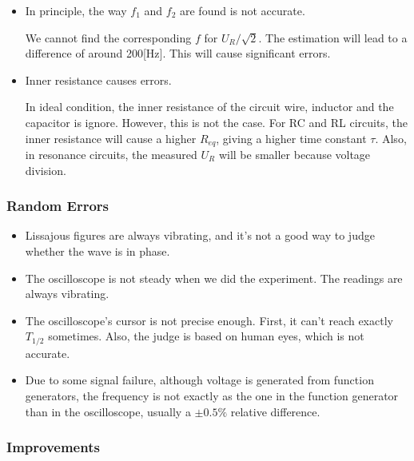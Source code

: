 \documentclass[a4paper]{article}
\begin{document}
\begin{itemize}
\item In principle, the way $f_1$ and $f_2$ are found is not accurate.

We cannot find the corresponding $f$ for $U_R/\sqrt{2}$. The estimation will lead to a difference of around 200[Hz]. This will cause significant errors.
\item Inner resistance causes errors.

In ideal condition, the inner resistance of the circuit wire, inductor and the capacitor is ignore. However, this is not the case. For RC and RL circuits, the inner resistance will cause a higher $R_{eq}$, giving a higher time constant $\tau$. Also, in resonance circuits, the measured $U_R$ will be smaller because voltage division.
\end{itemize}

\subsubsection{Random Errors}

\begin{itemize}
\item Lissajous figures are always vibrating, and it's not a good way to judge whether the wave is in phase. 
\item The oscilloscope is not steady when we did the experiment. The readings are always vibrating.
\item The oscilloscope's cursor is not precise enough. First, it can't reach exactly $T_{1/2}$ sometimes. Also, the judge is based on human eyes, which is not accurate.
\item Due to some signal failure, although voltage is generated from function generators, the frequency is not exactly as the one in the function generator than in the oscilloscope, usually a $\pm 0.5\%$ relative difference.
\end{itemize}

\subsubsection{Improvements}
\end{document}

